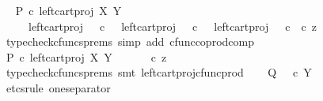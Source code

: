 \begin{isabellebody}
\ \isamarkupfalse%
\ {\isachardoublequoteopen}P\ {\isasymcirc}\isactrlsub c\ left{\isacharunderscore}{\kern0pt}cart{\isacharunderscore}{\kern0pt}proj\ X\ Y\isanewline
\ \ \ \ {\isacharequal}{\kern0pt}\ {\isacharparenleft}{\kern0pt}{\isacharparenleft}{\kern0pt}left{\isacharunderscore}{\kern0pt}cart{\isacharunderscore}{\kern0pt}proj\ {\isasymOmega}\ {\isasymOmega}\ {\isasymcirc}\isactrlsub c\ {\isasymlangle}{\isasymt}{\isacharcomma}{\kern0pt}{\isasymt}{\isasymrangle}{\isacharparenright}{\kern0pt}\ {\isasymamalg}\ {\isacharparenleft}{\kern0pt}left{\isacharunderscore}{\kern0pt}cart{\isacharunderscore}{\kern0pt}proj\ {\isasymOmega}\ {\isasymOmega}\ {\isasymcirc}\isactrlsub c\ {\isasymlangle}{\isasymf}{\isacharcomma}{\kern0pt}{\isasymf}{\isasymrangle}{\isacharparenright}{\kern0pt}\ {\isasymamalg}\ {\isacharparenleft}{\kern0pt}left{\isacharunderscore}{\kern0pt}cart{\isacharunderscore}{\kern0pt}proj\ {\isasymOmega}\ {\isasymOmega}\ {\isasymcirc}\isactrlsub c\ {\isasymlangle}{\isasymf}{\isacharcomma}{\kern0pt}{\isasymt}{\isasymrangle}{\isacharparenright}{\kern0pt}{\isacharparenright}{\kern0pt}\ {\isasymcirc}\isactrlsub c\ z{\isachardoublequoteclose}\isanewline
\ \ \ \ \isamarkupfalse%
\ {\isacharparenleft}{\kern0pt}typecheck{\isacharunderscore}{\kern0pt}cfuncs{\isacharunderscore}{\kern0pt}prems{\isacharcomma}{\kern0pt}\ simp\ add{\isacharcolon}{\kern0pt}\ cfunc{\isacharunderscore}{\kern0pt}coprod{\isacharunderscore}{\kern0pt}comp{\isacharparenright}{\kern0pt}\isanewline
\ \ \isamarkupfalse%
\ \isamarkupfalse%
\ {\isachardoublequoteopen}P\ {\isasymcirc}\isactrlsub c\ left{\isacharunderscore}{\kern0pt}cart{\isacharunderscore}{\kern0pt}proj\ X\ Y\ {\isacharequal}{\kern0pt}\ {\isacharparenleft}{\kern0pt}{\isasymt}\ {\isasymamalg}\ {\isasymf}\ {\isasymamalg}\ {\isasymf}{\isacharparenright}{\kern0pt}\ {\isasymcirc}\isactrlsub c\ z{\isachardoublequoteclose}\isanewline
\ \ \ \ \isamarkupfalse%
\ {\isacharparenleft}{\kern0pt}typecheck{\isacharunderscore}{\kern0pt}cfuncs{\isacharunderscore}{\kern0pt}prems{\isacharcomma}{\kern0pt}\ smt\ left{\isacharunderscore}{\kern0pt}cart{\isacharunderscore}{\kern0pt}proj{\isacharunderscore}{\kern0pt}cfunc{\isacharunderscore}{\kern0pt}prod{\isacharparenright}{\kern0pt}\isanewline
\isanewline
\ \ \isamarkupfalse%
\ {\isachardoublequoteopen}Q\ {\isacharequal}{\kern0pt}\ {\isasymt}\ {\isasymcirc}\isactrlsub c\ {\isasymbeta}\isactrlbsub Y\isactrlesub {\isachardoublequoteclose}\isanewline
\ \ \isamarkupfalse%
\ {\isacharparenleft}{\kern0pt}etcs{\isacharunderscore}{\kern0pt}rule\ one{\isacharunderscore}{\kern0pt}separator{\isacharparenright}{\kern0pt}\isanewline

\end{isabellebody}
